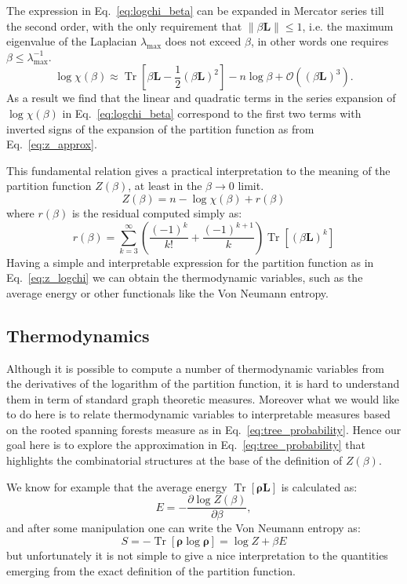\documentclass[10pt,aps,pre,twocolumn,nofootinbib,superscriptaddress,longbibliography]{revtex4-1}
\newcommand{\brho}{\boldsymbol \rho}
\newcommand{\bL}{\mathbf{L}}
\newcommand{\Tr}[1]{\operatorname{Tr}\left\lbrack #1\right\rbrack}
\begin{document}
The expression in Eq.~\ref{eq:logchi_beta} can be expanded in Mercator series till the second order, with the only requirement that $\| \beta \bL\| \leq 1$, i.e. the maximum eigenvalue of the Laplacian $\lambda_{\max}$ does not exceed $\beta$, in other words one requires $\beta \leq \lambda_{\max}^{-1}$.
\begin{equation}
\log \chi(\beta) \approx \Tr{ \beta \bL - \frac{1}{2}(\beta \bL)^2 } - n\log \beta + \mathcal{O}((\beta \bL)^3).
\end{equation}
As a result we find that the linear and quadratic terms in the series expansion of $\log\chi(\beta)$ in Eq.~\ref{eq:logchi_beta} correspond to the first two terms with inverted signs of the expansion of the partition function as from Eq.~\ref{eq:z_approx}.

This fundamental relation gives a practical interpretation to the meaning of the partition function $Z(\beta)$, at least in the $\beta \to 0$ limit.
\begin{equation}\label{eq:z_logchi}
Z(\beta) = n - \log\chi(\beta) + r(\beta)
\end{equation}
where $r(\beta)$ is the residual computed simply as:
\begin{equation}
r(\beta) = \sum_{k=3}^{\infty}\left( \frac{(-1)^k}{k!} + \frac{(-1)^{k+1}}{k} \right)\Tr{\left(\beta \bL\right)^k}
\end{equation}
Having a simple and interpretable expression for the partition function as in Eq.~\ref{eq:z_logchi} we can obtain the thermodynamic variables, such as the average energy or other functionals like the Von Neumann entropy.
\subsection{Thermodynamics}
Although it is possible to compute a number of thermodynamic variables from the derivatives of the logarithm of the partition function, it is hard to understand them in term of standard graph theoretic measures.
Moreover what we would like to do here is to relate thermodynamic variables to interpretable measures based on the  rooted spanning forests measure as in Eq.~\ref{eq:tree_probability}.
Hence our goal here is to explore the approximation in Eq.~\ref{eq:tree_probability} that highlights the combinatorial structures at the base of the definition of $Z(\beta)$.

We know for example that the average energy $\Tr{\brho \bL}$ is calculated as:
\begin{equation}\label{eq:average_energy}
E = -\frac{\partial \log Z(\beta)}{\partial \beta},
\end{equation}
and after some manipulation one can write the Von Neumann entropy as:
\begin{equation}
S = -\Tr{\brho \log \brho } = \log Z + \beta E
\end{equation}
but unfortunately it is not simple to give a nice interpretation to the quantities emerging from the exact definition of the partition function.
\end{document}
